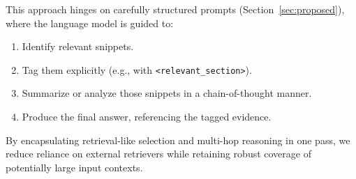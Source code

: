 This approach hinges on carefully structured prompts (Section~\ref{sec:proposed}), where the language model is guided to:
\begin{enumerate}
    \item Identify relevant snippets.
    \item Tag them explicitly (e.g., with \texttt{<relevant\_section>}).
    \item Summarize or analyze those snippets in a chain-of-thought manner.
    \item Produce the final answer, referencing the tagged evidence.
\end{enumerate}
By encapsulating retrieval-like selection and multi-hop reasoning in one pass, we reduce reliance on external retrievers while retaining robust coverage of potentially large input contexts.

